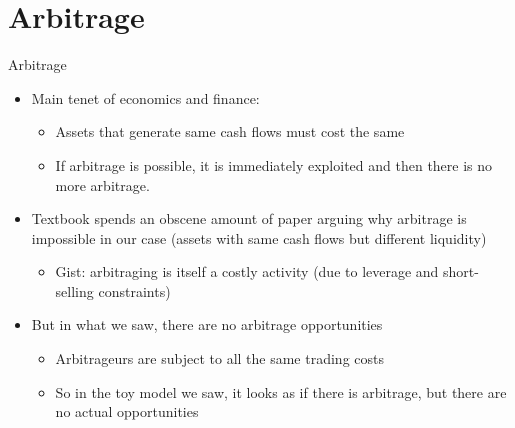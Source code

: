 \documentclass[english,10pt
,aspectratio=169
]{beamer}
\begin{document}
\section{Arbitrage}

\begin{frame}{Arbitrage}
	\begin{itemize}
		\item Main tenet of economics and finance: 
		\begin{itemize}
			\item Assets that generate same cash flows must cost the same
			\item If arbitrage is possible, it is immediately exploited and then there is no more arbitrage.
		\end{itemize}
		\pause[4]
		\item Textbook spends an obscene amount of paper arguing \alert{why arbitrage is impossible} in our case (assets with same cash flows but different liquidity)
		\begin{itemize}
			\item Gist: arbitraging is itself a costly activity (due to leverage and short-selling constraints)
		\end{itemize}
		\item But in what we saw, \alert{there are no arbitrage opportunities}
		\begin{itemize}
			\item Arbitrageurs are subject to all the same trading costs
			\item So in the toy model we saw, it looks as if there is arbitrage, but there are no actual opportunities
		\end{itemize}
	\end{itemize}
\end{frame}
\end{document}
